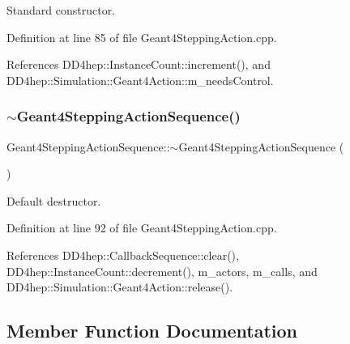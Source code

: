 Standard constructor. 



Definition at line 85 of file Geant4\+Stepping\+Action.\+cpp.



References D\+D4hep\+::\+Instance\+Count\+::increment(), and D\+D4hep\+::\+Simulation\+::\+Geant4\+Action\+::m\+\_\+needs\+Control.

\hypertarget{class_d_d4hep_1_1_simulation_1_1_geant4_stepping_action_sequence_a7b7b346f45f9194e6aec6eafdde18448}{}\label{class_d_d4hep_1_1_simulation_1_1_geant4_stepping_action_sequence_a7b7b346f45f9194e6aec6eafdde18448} 
\subsubsection{\texorpdfstring{$\sim$\+Geant4\+Stepping\+Action\+Sequence()}{~Geant4SteppingActionSequence()}}
{\footnotesize\ttfamily Geant4\+Stepping\+Action\+Sequence\+::$\sim$\+Geant4\+Stepping\+Action\+Sequence (\begin{DoxyParamCaption}{ }\end{DoxyParamCaption})\hspace{0.3cm}{\ttfamily [virtual]}}



Default destructor. 



Definition at line 92 of file Geant4\+Stepping\+Action.\+cpp.



References D\+D4hep\+::\+Callback\+Sequence\+::clear(), D\+D4hep\+::\+Instance\+Count\+::decrement(), m\+\_\+actors, m\+\_\+calls, and D\+D4hep\+::\+Simulation\+::\+Geant4\+Action\+::release().



\subsection{Member Function Documentation}
\hypertarget{class_d_d4hep_1_1_simulation_1_1_geant4_stepping_action_sequence_a39d7f26d436a3f512c2b467bad9d4beb}{}\label{class_d_d4hep_1_1_simulation_1_1_geant4_stepping_action_sequence_a39d7f26d436a3f512c2b467bad9d4beb} 
